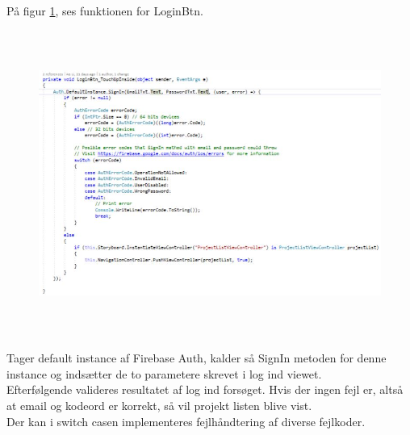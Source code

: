 På figur \ref{fig:LoginBtn}, ses funktionen for LoginBtn.
\begin{figure}[H] %
	\centering
	\includegraphics[height=10cm, width=18cm]{../ArkitekturDesign/Design/Login/LoginBtn}
	\caption{}
	\label{fig:LoginBtn}
\end{figure}
Tager default instance af Firebase Auth, kalder så SignIn metoden for denne instance og indsætter de to parametere skrevet i log ind viewet. \\
Efterfølgende valideres resultatet af log ind forsøget. Hvis der ingen fejl er, altså at email og kodeord er korrekt, så vil projekt listen blive vist. \\
Der kan i switch casen implementeres fejlhåndtering af diverse fejlkoder. 


\clearpage